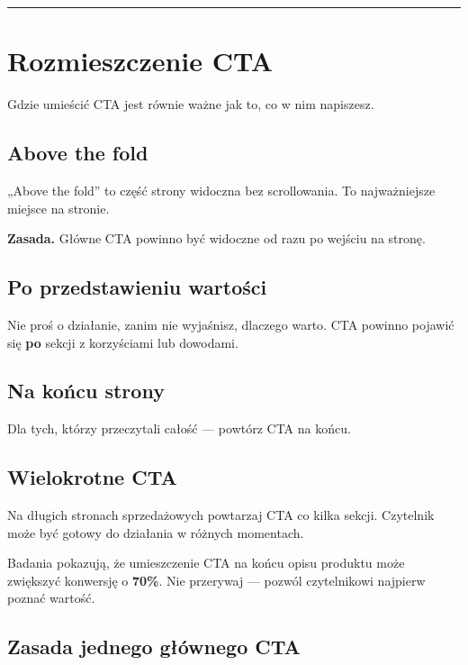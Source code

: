 \documentclass[
  12pt,
  a4paper,
  twoside,
  openright,
  12pt,
  DIV=12,
  BCOR=12mm]{scrbook}
\newcommand{\decoline}{%
  \begin{center}
    \textcolor{bordergray}{\rule{0.3\textwidth}{0.5pt}}
  \end{center}
}
\begin{document}
\decoline

\section{Rozmieszczenie CTA}\label{rozmieszczenie-cta}

Gdzie umieścić CTA jest równie ważne jak to, co w nim napiszesz.

\subsection{Above the fold}\label{above-the-fold}

„Above the fold'' to część strony widoczna bez scrollowania. To
najważniejsze miejsce na stronie.

\textbf{Zasada.} Główne CTA powinno być widoczne od razu po wejściu na
stronę.

\subsection{Po przedstawieniu
wartości}\label{po-przedstawieniu-wartoux15bci}

Nie proś o działanie, zanim nie wyjaśnisz, dlaczego warto. CTA powinno
pojawić się \textbf{po} sekcji z korzyściami lub dowodami.

\subsection{Na końcu strony}\label{na-koux144cu-strony}

Dla tych, którzy przeczytali całość --- powtórz CTA na końcu.

\subsection{Wielokrotne CTA}\label{wielokrotne-cta}

Na długich stronach sprzedażowych powtarzaj CTA co kilka sekcji.
Czytelnik może być gotowy do działania w różnych momentach.

\begin{wskazowka}
Badania pokazują, że umieszczenie CTA na końcu opisu produktu może zwiększyć konwersję o \textbf{70\%}. Nie przerywaj --- pozwól czytelnikowi najpierw poznać wartość.
\end{wskazowka}

\subsection{Zasada jednego głównego
CTA}\label{zasada-jednego-gux142uxf3wnego-cta}
\end{document}
